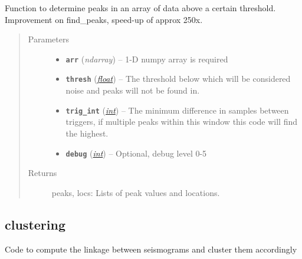\documentclass[a4paper,10pt,english]{sphinxmanual}
\begin{document}
\begin{fulllineitems}
\label{utils:findpeaks.find_peaks2}
Function to determine peaks in an array of data above a certain threshold.
Improvement on find\_peaks, speed-up of approx 250x.
\begin{quote}\begin{description}
\item[{Parameters}] \leavevmode\begin{itemize}
\item {} 
\textbf{\texttt{arr}} (\emph{ndarray}) -- 1-D numpy array is required

\item {} 
\textbf{\texttt{thresh}} (\href{https://docs.python.org/library/functions.html\#float}{\emph{float}}) -- The threshold below which will be considered noise and peaks    will not be found in.

\item {} 
\textbf{\texttt{trig\_int}} (\href{https://docs.python.org/library/functions.html\#int}{\emph{int}}) -- The minimum difference in samples between triggers,    if multiple peaks within this window this code will find the highest.

\item {} 
\textbf{\texttt{debug}} (\href{https://docs.python.org/library/functions.html\#int}{\emph{int}}) -- Optional, debug level 0-5

\end{itemize}

\item[{Returns}] \leavevmode
peaks, locs: Lists of peak values and locations.

\end{description}\end{quote}

\end{fulllineitems}



\subsection{clustering}
\label{utils:clustering}\label{utils:module-clustering}
Code to compute the linkage between seismograms and cluster them accordingly
\end{document}
